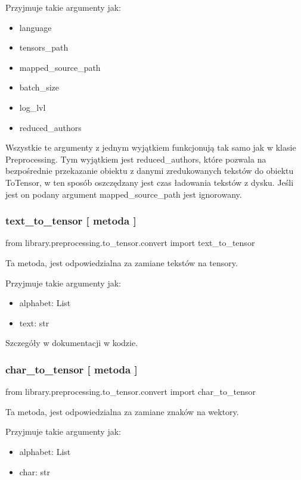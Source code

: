 Przyjmuje takie argumenty jak: 

\begin{itemize}
	\item language
	\item tensors\_path
	\item mapped\_source\_path
	\item batch\_size
	\item log\_lvl
	\item reduced\_authors
\end{itemize}

Wszystkie te argumenty z jednym wyjątkiem funkcjonują tak samo jak w klasie Preprocessing. 
Tym wyjątkiem jest reduced\_authors, które pozwala na bezpośrednie przekazanie obiektu z danymi 
zredukowanych tekstów do obiektu ToTensor, w ten sposób oszczędzany jest czas ładowania tekstów z 
dysku. Jeśli jest on podany argument mapped\_source\_path jest ignorowany.



\subsubsection{text\_to\_tensor [ metoda ] }
\begin{import}
from library.preprocessing.to_tensor.convert import text_to_tensor
\end{import}
Ta metoda, jest odpowiedzialna za zamiane tekstów na tensory.

Przyjmuje takie argumenty jak: 

\begin{itemize}
	\item alphabet: List
	\item text: str
\end{itemize}

Szczegóły w dokumentacji w kodzie.

\subsubsection{char\_to\_tensor [ metoda ] }
\begin{import}
from library.preprocessing.to_tensor.convert import char_to_tensor
\end{import}
Ta metoda, jest odpowiedzialna za zamiane znaków na wektory.

Przyjmuje takie argumenty jak: 

\begin{itemize}
	\item alphabet: List
	\item char: str
\end{itemize}

